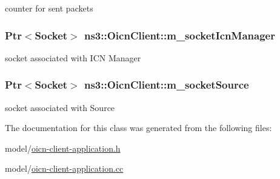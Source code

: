 counter for sent packets 

\hypertarget{classns3_1_1OicnClient_a6f062f8c4a35ad072f301141d986ba77}{
\subsubsection[{m\-\_\-socket\-Icn\-Manager}]{\setlength{\rightskip}{0pt plus 5cm}Ptr$<$Socket$>$ ns3\-::\-Oicn\-Client\-::m\-\_\-socket\-Icn\-Manager\hspace{0.3cm}{\ttfamily [private]}}}\label{classns3_1_1OicnClient_a6f062f8c4a35ad072f301141d986ba77}


socket associated with I\-C\-N Manager 

\hypertarget{classns3_1_1OicnClient_a7903a89bbce331174829f0f83b932ca0}{
\subsubsection[{m\-\_\-socket\-Source}]{\setlength{\rightskip}{0pt plus 5cm}Ptr$<$Socket$>$ ns3\-::\-Oicn\-Client\-::m\-\_\-socket\-Source\hspace{0.3cm}{\ttfamily [private]}}}\label{classns3_1_1OicnClient_a7903a89bbce331174829f0f83b932ca0}


socket associated with Source 



The documentation for this class was generated from the following files\-:\begin{DoxyCompactItemize}
\item 
model/\hyperlink{oicn-client-application_8h}{oicn-\/client-\/application.\-h}\item 
model/\hyperlink{oicn-client-application_8cc}{oicn-\/client-\/application.\-cc}\end{DoxyCompactItemize}
